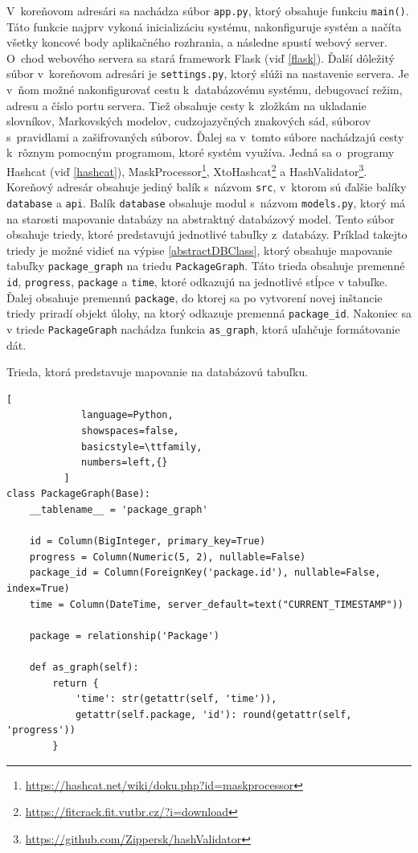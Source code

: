\documentclass[slovak]{fitthesis}
\begin{document}
V~koreňovom adresári sa nachádza súbor \texttt{app.py}, ktorý obsahuje funkciu \texttt{main()}. Táto funkcie najprv vykoná inicializáciu systému, nakonfiguruje systém a načíta všetky koncové body aplikačného rozhrania, a následne spustí webový server. O~chod webového servera sa stará framework Flask (viď \ref{flask}). Ďalší dôležitý súbor v~koreňovom adresári je \texttt{settings.py}, ktorý slúži na nastavenie servera. Je v~ňom možné nakonfigurovať cestu k~databázovému systému, debugovací režim, adresu a číslo portu servera. Tiež obsahuje cesty k~zložkám na ukladanie slovníkov, Markovských modelov, cudzojazyčných znakových sád, súborov s~pravidlami a zašifrovaných súborov. Ďalej sa v~tomto súbore nachádzajú cesty k~rôznym pomocným programom, ktoré systém využíva. Jedná sa o~programy Hashcat (viď \ref{hashcat}), MaskProcessor\footnote{\url{https://hashcat.net/wiki/doku.php?id=maskprocessor}}, XtoHashcat\footnote{\url{https://fitcrack.fit.vutbr.cz/?i=download}} a HashValidator\footnote{\url{https://github.com/Zippersk/hashValidator}}. Koreňový adresár obsahuje jediný balík s~názvom \texttt{src}, v~ktorom sú ďalšie balíky \texttt{database} a \texttt{api}. Balík \texttt{database} obsahuje modul s~názvom \texttt{models.py}, ktorý má na starosti mapovanie databázy na abstraktný databázový model. Tento súbor obsahuje triedy, ktoré predstavujú jednotlivé tabuľky z~databázy. Príklad takejto triedy je možné vidieť na výpise \ref{abstractDBClass}, ktorý obsahuje mapovanie tabuľky \texttt{package\_graph} na triedu \texttt{PackageGraph}. Táto trieda obsahuje premenné \texttt{id}, \texttt{progress}, \texttt{package} a \texttt{time}, ktoré odkazujú na jednotlivé stĺpce v tabuľke. Ďalej obsahuje premennú \texttt{package}, do ktorej sa po vytvorení novej inštancie triedy priradí objekt úlohy, na ktorý odkazuje premenná \texttt{package\_id}. Nakoniec sa v triede \texttt{PackageGraph} nachádza funkcia \texttt{as\_graph}, ktorá uľahčuje formátovanie dát.
\begin{algorithm}
  \caption{Trieda, ktorá predstavuje mapovanie na databázovú tabuľku.}
  \label{abstractDBClass}
  \begin{lstlisting}[
             language=Python,
             showspaces=false,
             basicstyle=\ttfamily,
             numbers=left,{}
          ]
class PackageGraph(Base):
    __tablename__ = 'package_graph'

    id = Column(BigInteger, primary_key=True)
    progress = Column(Numeric(5, 2), nullable=False)
    package_id = Column(ForeignKey('package.id'), nullable=False, index=True)
    time = Column(DateTime, server_default=text("CURRENT_TIMESTAMP"))

    package = relationship('Package')

    def as_graph(self):
        return {
            'time': str(getattr(self, 'time')),
            getattr(self.package, 'id'): round(getattr(self, 'progress'))
        }
  \end{lstlisting}
\end{algorithm}
\end{document}
